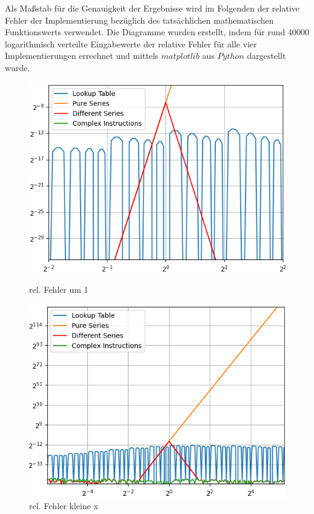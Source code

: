 \documentclass[course=erap] {aspdoc}
\begin{document}
    Als Maßstab für die Genauigkeit der Ergebnisse wird im Folgenden der relative Fehler der Implementierung bezüglich des tatsächlichen mathematischen Funktionswerts verwendet.
    Die Diagramme wurden erstellt, indem für rund 40000 logarithmisch verteilte Eingabewerte der relative Fehler für alle vier Implementierungen errechnet und mittels $matplotlib$ aus $Python$ dargestellt wurde.

    \begin{figure}[htbp]
        \centering
        \begin{minipage}[b]{0.45\textwidth}
            \centering
            \includegraphics[width=\textwidth]{images/Figure1}
            \caption{rel. Fehler um 1}
        \end{minipage}
        \hfill
        \begin{minipage}[b]{0.45\textwidth}
            \centering
            \includegraphics[width=\textwidth]{images/Figure2}
            \caption{rel. Fehler kleine x}
        \end{minipage}
    \end{figure}
\end{document}

